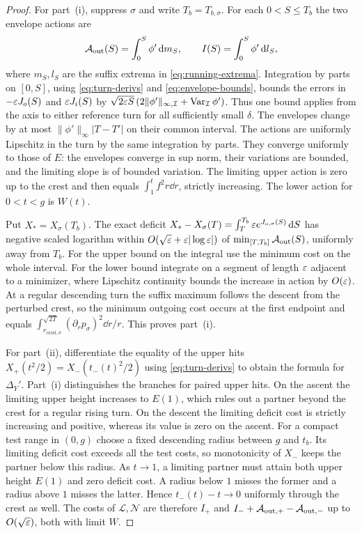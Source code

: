 \begin{proof}
For part~\textup{(i)}, suppress $\sigma$ and write $T_b=T_{b,\sigma}$.
For each $0<S\le T_b$ the two envelope actions are
\[
 \mathcal A_{\rm out}(S)=\int_0^S\phi'\,\mathrm{d} m_S,\qquad
 I(S)=\int_0^S\phi'\,\mathrm{d} l_S,
\]
where $m_S,l_S$ are the suffix extrema in \eqref{eq:running-extrema}.
Integration by parts on $[0,S]$, using \eqref{eq:turn-derivs} and
\eqref{eq:envelope-bounds}, bounds the errors in $-\varepsilon J_o(S)$ and
$\varepsilon J_i(S)$ by $\sqrt{2\varepsilon S}\,(2\|\phi'\|_{\infty,\mathcal I}+
\operatorname{Var}_{\mathcal I}\phi')$. Thus one bound applies from the axis to
either reference turn for all sufficiently small $\delta$.
The envelopes change by at most $\|\phi'\|_\infty |T-T'|$ on their
common interval. The actions are uniformly Lipschitz in the turn by
the same integration by parts. They converge uniformly to those of $E$:
the envelopes converge in sup norm, their variations are bounded, and
the limiting slope is of bounded variation. The limiting upper action
is zero up to the crest and then equals $\int_1^t f^2 r\dd r$, strictly
increasing. The lower action for $0<t<g$ is $W(t)$.

Put $X_*=X_\sigma(T_b)$.
The exact deficit $X_*-X_\sigma(T)=\int_T^{T_b}\varepsilon e^{J_{o,\sigma}(S)}\,\mathrm{d} S$
has negative scaled logarithm within
$O(\sqrt{\varepsilon}+\varepsilon|\log\varepsilon|)$ of $\min_{[T,T_b]}\mathcal A_{\rm out}(S)$,
uniformly away from $T_b$. For the upper bound on the integral use the minimum cost on the
whole interval. For the lower bound integrate on a segment of length
$\varepsilon$ adjacent to a minimizer, where Lipschitz continuity bounds the
increase in action by $O(\varepsilon)$. At a regular descending turn the
suffix maximum follows the descent from the perturbed crest, so the
minimum outgoing cost occurs at the first endpoint and equals
$\int_{r_{\mathrm{crest},\sigma}}^{\sqrt{2T}}(\partial_r p_\sigma)^2\dd r/r$.
This proves part~\textup{(i)}.

For part~\textup{(ii)}, differentiate the equality of the upper hits
$X_+(t^2/2)=X_-(t_-(t)^2/2)$ using \eqref{eq:turn-derivs} to obtain the
formula for $\Delta_Y'$. Part~\textup{(i)} distinguishes the branches for
paired upper hits. On the ascent the limiting upper
height increases to $E(1)$, which rules out a partner beyond the crest
for a regular rising turn. On the descent the limiting deficit cost is
strictly increasing and positive, whereas its value is zero on the ascent.
For a compact test range in $(0,g)$ choose a fixed descending radius
between $g$ and $t_b$. Its limiting deficit cost exceeds all the test
costs, so monotonicity of $X_-$ keeps the partner below this radius.
As $t\to1$, a limiting partner must attain both upper height $E(1)$
and zero deficit cost. A radius below $1$ misses the former and a
radius above $1$ misses the latter. Hence $t_-(t)-t\to0$ uniformly
through the crest as well. The costs of $\mathcal L,\mathcal N$ are therefore
$I_+$ and $I_-+\mathcal A_{{\rm out},+}-\mathcal A_{{\rm out},-}$ up to $O(\sqrt{\varepsilon})$, both with limit $W$.


\end{proof}
